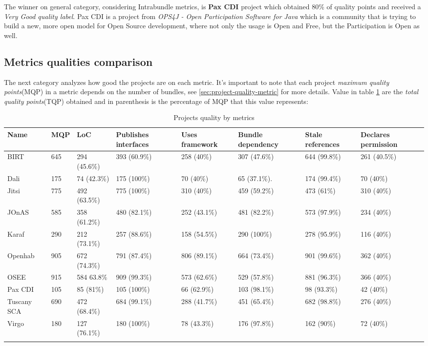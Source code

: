 The winner on general category, considering Intrabundle metrics, is \textbf{Pax CDI} project which obtained 80\% of quality points and received a \emph{Very Good quality label}. Pax CDI is a project from \emph{OPS4J - Open Participation Software for Java} which is a community that is trying to build a new, more open model for Open Source development, where not only the usage is Open and Free, but the Participation is Open as well. 

\subsection{Metrics qualities comparison}

The next category analyzes how good the projects are on each metric. It's important to note that each project \emph{maximum quality points}(MQP) in a metric depends on the number of bundles, see \ref{sec:project-quality-metric} for more details. Value in table \ref{projects-metrics-quality} are the \emph{total quality points}(TQP) obtained and in parenthesis is the percentage of MQP that this value represents:  

\begin{table}[h]
\tiny
\caption{Projects quality by metrics}
\label{projects-metrics-quality}
    \begin{tabular}{  p{3cm} | p{2cm} | p{2cm} | p{2cm} | p{2cm} | p{2cm} | p{2cm} | p{2cm} }
    \Xhline{2\arrayrulewidth}
    Name & MQP & LoC & Publishes interfaces & Uses framework & Bundle dependency & Stale references & Declares permission \\  \hline
    BIRT & 645 & 294 (45.6\%) & 393 (60.9\%) & 258 (40\%) & 307 (47.6\%) & 644 (99.8\%) & 261 (40.5\%)\\ \hline
    Dali & 175 & 74 (42.3\%) & 175 (100\%) & 70 (40\%) & 65 (37.1\%). & 174 (99.4\%) & 70 (40\%)\\ \hline
    Jitsi & 775 & 492 (63.5\%) & 775 (100\%) & 310 (40\%) & 459 (59.2\%) & 473 (61\%) & 310 (40\%)\\ \hline
    JOnAS & 585 & 358 (61.2\%) & 480 (82.1\%) & 252 (43.1\%) & 481 (82.2\%) & 573 (97.9\%) & 234 (40\%)\\ \hline
    Karaf & 290 & 212 (73.1\%) & 257 (88.6\%) & 158 (54.5\%) &  290 (100\%) & 278 (95.9\%) & 116 (40\%)\\ \hline
    Openhab & 905 & 672 (74.3\%)& 791 (87.4\%) & 806 (89.1\%)&  664 (73.4\%) & 901 (99.6\%) & 362 (40\%)\\ \hline
    OSEE & 915 & 584 63.8\% & 909 (99.3\%) & 573 (62.6\%) & 529 (57.8\%) & 881 (96.3\%) & 366 (40\%)\\ \hline
    Pax CDI & 105 & 85 (81\%) & 105 (100\%) & 66 (62.9\%) & 103 (98.1\%) & 98 (93.3\%) & 42 (40\%) \\ \hline
    Tuscany SCA & 690 & 472 (68.4\%) & 684 (99.1\%) & 288 (41.7\%) & 451 (65.4\%) &  682 (98.8\%) & 276 (40\%) \\ \hline
    Virgo & 180 & 127 (76.1\%) & 180 (100\%) & 78 (43.3\%) & 176 (97.8\%) & 162 (90\%) & 72 (40\%)\\
   \Xhline{2\arrayrulewidth}
    \end{tabular}
\end{table}
\FloatBarrier   

